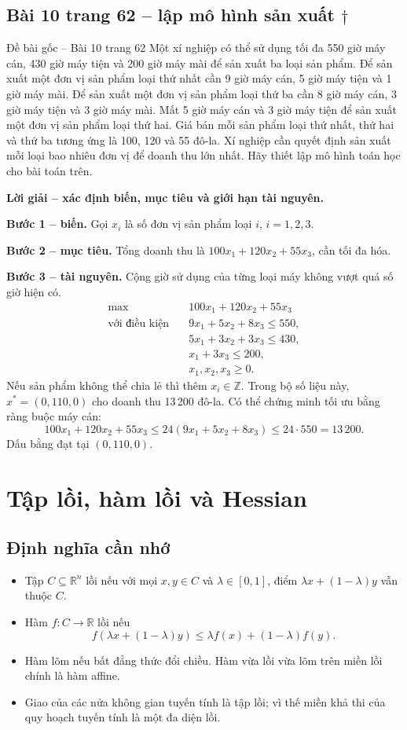 \documentclass[11pt,a4paper]{article}
\newcommand{\R}{\mathbb{R}}
\begin{document}
\clearpage
\subsection{Bài 10 trang 62 -- lập mô hình sản xuất \(\dagger\)}
\begin{questionbox}{Đề bài gốc -- Bài 10 trang 62}
Một xí nghiệp có thể sử dụng tối đa 550 giờ máy cán, 430 giờ máy tiện và 200 giờ máy mài để sản xuất ba loại sản phẩm. Để sản xuất một đơn vị sản phẩm loại thứ nhất cần 9 giờ máy cán, 5 giờ máy tiện và 1 giờ máy mài. Để sản xuất một đơn vị sản phẩm loại thứ ba cần 8 giờ máy cán, 3 giờ máy tiện và 3 giờ máy mài. Mất 5 giờ máy cán và 3 giờ máy tiện để sản xuất một đơn vị sản phẩm loại thứ hai. Giá bán mỗi sản phẩm loại thứ nhất, thứ hai và thứ ba tương ứng là 100, 120 và 55 đô-la. Xí nghiệp cần quyết định sản xuất mỗi loại bao nhiêu đơn vị để doanh thu lớn nhất. Hãy thiết lập mô hình toán học cho bài toán trên.
\end{questionbox}

\textbf{Lời giải -- xác định biến, mục tiêu và giới hạn tài nguyên.}

\textbf{Bước 1 -- biến.} Gọi \(x_i\) là số đơn vị sản phẩm loại \(i\), \(i=1,2,3\).

\textbf{Bước 2 -- mục tiêu.} Tổng doanh thu là \(100x_1+120x_2+55x_3\), cần tối đa hóa.

\textbf{Bước 3 -- tài nguyên.} Cộng giờ sử dụng của từng loại máy không vượt quá số giờ hiện có.
\[
\begin{aligned}
\max\quad &100x_1+120x_2+55x_3\\
\text{với điều kiện}\quad
&9x_1+5x_2+8x_3\le550,\\
&5x_1+3x_2+3x_3\le430,\\
&x_1+3x_3\le200,\\
&x_1,x_2,x_3\ge0.
\end{aligned}
\]
Nếu sản phẩm không thể chia lẻ thì thêm \(x_i\in\mathbb Z\). Trong bộ số liệu này, \(x^\ast=(0,110,0)\) cho doanh thu 13\,200 đô-la. Có thể chứng minh tối ưu bằng ràng buộc máy cán:
\[
100x_1+120x_2+55x_3
\le 24(9x_1+5x_2+8x_3)\le24\cdot550=13\,200.
\]
Dấu bằng đạt tại \((0,110,0)\).

\section{Tập lồi, hàm lồi và Hessian}
\subsection{Định nghĩa cần nhớ}
\begin{itemize}
\item Tập \(C\subseteq\R^n\) lồi nếu với mọi \(x,y\in C\) và \(\lambda\in[0,1]\), điểm \(\lambda x+(1-\lambda)y\) vẫn thuộc \(C\).
\item Hàm \(f:C\to\R\) lồi nếu
\[
f(\lambda x+(1-\lambda)y)\le \lambda f(x)+(1-\lambda)f(y).
\]
\item Hàm lõm nếu bất đẳng thức đổi chiều. Hàm vừa lồi vừa lõm trên miền lồi chính là hàm affine.
\item Giao của các nửa không gian tuyến tính là tập lồi; vì thế miền khả thi của quy hoạch tuyến tính là một đa diện lồi.
\end{itemize}
\end{document}
